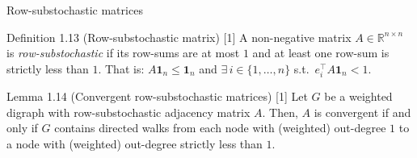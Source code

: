 \begin{frame}[label=bk-prelim3]{Row-substochastic matrices}
  \scriptsize
  \begin{block}{Definition 1.13 (Row-substochastic matrix) [1]}
    A non-negative matrix $A \in \mathbb{R}^{n \times n}$ is \emph{row-substochastic} if
    its row-sums are at most $1$ and at least one row-sum is strictly less than $1$. That
    is: $A \mathbf{1}_n \leq \mathbf{1}_n$ and
    $\exists\, i \in \{1, \dots, n\}$ s.t.\ $e_i^\top A \mathbf{1}_n < 1$.
  \end{block}
  \begin{block}{Lemma 1.14 (Convergent row-substochastic matrices) [1]}
    Let $G$ be a weighted digraph with row-substochastic adjacency matrix $A$. Then, $A$
    is convergent if and only if $G$ contains directed walks from each node with
    (weighted) out-degree $1$ to a node with (weighted) out-degree strictly less than $1$.
  \end{block}
\end{frame}


